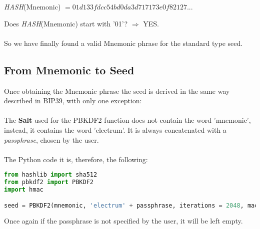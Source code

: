 \begin{center}
	\textit{HASH}(Mnemonic) $= 01d133fdcc54bd0da3d717173e0f82127...$
\end{center}
Does \textit{HASH}(Mnemonic) start with '01'? $\Rightarrow$ YES.
\\ \\
So we have finally found a valid Mnemonic phrase for the standard type seed.


\subsection{From Mnemonic to Seed}
Once obtaining the Mnemonic phrase the seed is derived in the same way described in BIP39, with only one exception:
\\ \\
The \textbf{Salt} used for the PBKDF2 function does not contain the word 'mnemonic', instead, it contains the word 'electrum'. It is always concatenated with a \textit{passphrase}, chosen by the user.
\\ \\
The Python code it is, therefore, the following:  

\begin{lstlisting}[language=Python]
from hashlib import sha512
from pbkdf2 import PBKDF2
import hmac

seed = PBKDF2(mnemonic, 'electrum' + passphrase, iterations = 2048, macmodule = hmac, digestmodule = sha512).read(64)
\end{lstlisting}


\begin{flushleft}
	Once again if the passphrase is not specified by the user, it will be left empty.
\end{flushleft}



